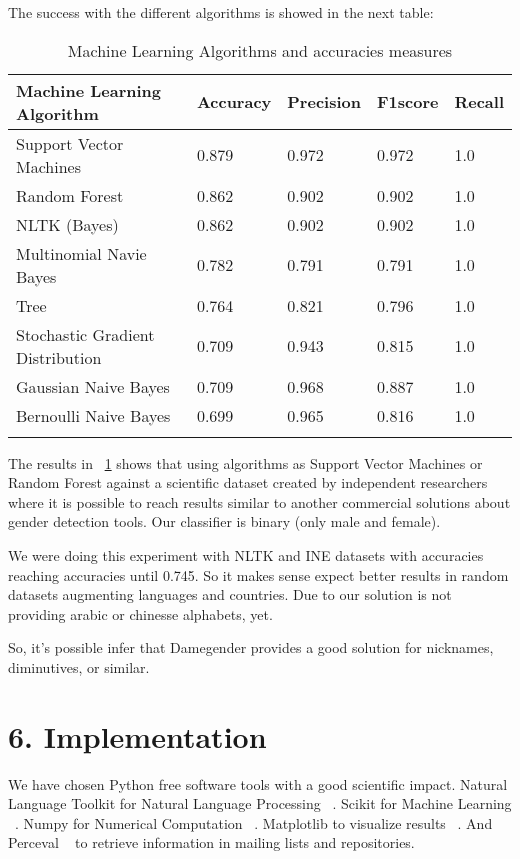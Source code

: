 \documentclass[fleqn,10pt]{wlpeerj} %
\begin{document}
The success with the different algorithms is showed in the next table:

\begin{longtable}[]{@{}lllll@{}}
  \toprule
  Machine Learning Algorithm & Accuracy & Precision & F1score & Recall \tabularnewline
  \midrule
  \endhead

 Support Vector Machines             &    0.879 &     0.972 &   0.972 &    1.0 & \tabularnewline
 Random Forest                       &    0.862 &     0.902 &   0.902 &    1.0 & \tabularnewline
 NLTK (Bayes)                        &    0.862 &     0.902 &   0.902 &    1.0 & \tabularnewline
 Multinomial Navie Bayes             &    0.782 &     0.791 &   0.791 &    1.0 & \tabularnewline
 Tree                                &    0.764 &     0.821 &   0.796 &    1.0 & \tabularnewline
 Stochastic Gradient Distribution    &    0.709 &     0.943 &   0.815 &    1.0 & \tabularnewline
 Gaussian Naive Bayes                &    0.709 &     0.968 &   0.887 &    1.0 & \tabularnewline
 Bernoulli Naive Bayes               &    0.699 &     0.965 &   0.816 &    1.0 & \tabularnewline
 
\bottomrule
\caption{Machine Learning Algorithms and accuracies measures}
\label{table:MLAccuracies}
\end{longtable}

The results in ~\ref{table:MLAccuracies} shows that using algorithms
as Support Vector Machines or Random Forest against a scientific
dataset created by independent researchers where it is possible to
reach results similar to another commercial solutions about gender
detection tools. Our classifier is binary (only male and female).

We were doing this experiment with NLTK and INE datasets with
accuracies reaching accuracies until 0.745. So it makes sense expect
better results in random datasets augmenting languages and
countries. Due to our solution is not providing arabic or chinesse
alphabets, yet.

So, it's possible infer that Damegender provides a good solution for
nicknames, diminutives, or similar.

\section*{6. Implementation}

We have chosen Python free software tools with a good scientific
impact. Natural Language Toolkit for Natural Language Processing
~\cite{loper2002nltk}. Scikit for Machine Learning
~\cite{pedregosa2011scikit}. Numpy for Numerical Computation
~\cite{van2011numpy}. Matplotlib to visualize results
~\cite{hunter2007matplotlib}. And Perceval ~\cite{duenas2018perceval}
to retrieve information in mailing lists and repositories.
\end{document}
